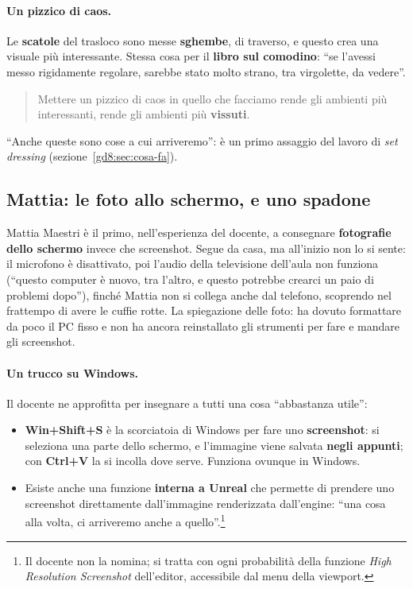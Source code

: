 \paragraph{Un pizzico di caos.} Le \textbf{scatole} del trasloco sono messe
\textbf{sghembe}, di traverso, e questo crea una visuale più interessante.
Stessa cosa per il \textbf{libro sul comodino}: ``se l'avessi messo
rigidamente regolare, sarebbe stato molto strano, tra virgolette, da vedere''.
\begin{quote}
Mettere un pizzico di caos in quello che facciamo rende gli ambienti più
interessanti, rende gli ambienti più \textbf{vissuti}.
\end{quote}
``Anche queste sono cose a cui arriveremo'': è un primo assaggio del lavoro di
\emph{set dressing} (sezione~\ref{gd8:sec:cosa-fa}).

\subsection{Mattia: le foto allo schermo, e uno spadone}

Mattia Maestri è il primo, nell'esperienza del docente, a consegnare
\textbf{fotografie dello schermo} invece che screenshot. Segue da casa, ma
all'inizio non lo si sente: il microfono è disattivato, poi l'audio della
televisione dell'aula non funziona (``questo computer è nuovo, tra l'altro, e
questo potrebbe crearci un paio di problemi dopo''), finché Mattia non si
collega anche dal telefono, scoprendo nel frattempo di avere le cuffie rotte.
La spiegazione delle foto: ha dovuto formattare da poco il PC fisso e non ha
ancora reinstallato gli strumenti per fare e mandare gli screenshot.

\paragraph{Un trucco su Windows.} Il docente ne approfitta per insegnare a tutti
una cosa ``abbastanza utile'':
\begin{itemize}
  \item \textbf{Win+Shift+S} è la scorciatoia di Windows per fare uno
        \textbf{screenshot}: si seleziona una parte dello schermo, e
        l'immagine viene salvata \textbf{negli appunti}; con \textbf{Ctrl+V}
        la si incolla dove serve. Funziona ovunque in Windows.
  \item Esiste anche una funzione \textbf{interna a Unreal} che permette di
        prendere uno screenshot direttamente dall'immagine renderizzata
        dall'engine: ``una cosa alla volta, ci arriveremo anche a
        quello''.\footnote{Il docente non la nomina; si tratta con ogni
        probabilità della funzione \emph{High Resolution Screenshot}
        dell'editor, accessibile dal menu della viewport.}
\end{itemize}

